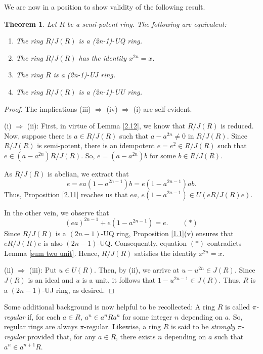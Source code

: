 \documentclass[10pt,a4paper]{amsart}
\newtheorem{theorem}{Theorem}[section]
\begin{document}
\medskip

We are now in a position to show validity of the following result.

\begin{theorem}\label{semipotent}
Let $R$ be a semi-potent ring. The following are equivalent:
\begin{enumerate}
\item	
The ring $R/J(R)$ is a (2n-1)-UQ ring.
\item	
The ring $R/J(R)$ has the identity $x^{2n} = x$.
\item	
The ring $R$ is a (2n-1)-UJ ring.
\item	
The ring $R/J(R)$ is a (2n-1)-UU ring.
\end{enumerate}
\end{theorem}

\begin{proof}
The implications (iii) $\Rightarrow$ (iv) $\Rightarrow$ (i) are self-evident.

(i) $\Rightarrow$ (ii): First, in virtue of Lemma \ref{2.12}, we know that \( R/J(R) \) is reduced. Now, suppose there is \( a \in R/J(R) \) such that \( a - a^{2n} \neq 0 \) in \( R/J(R) \). Since \( R/J(R) \) is semi-potent, there is an idempotent \( e = e^2 \in R/J(R) \) such that \( e \in (a - a^{2n})R/J(R) \). So, \( e = (a - a^{2n})b \) for some \( b \in R/J(R) \).

As \( R/J(R) \) is abelian, we extract that
\[
e = ea(1 - a^{2n-1})b = e(1 - a^{2n-1})ab.
\]
Thus, Proposition \ref{2.11} reaches us that \( ea,\, e(1 - a^{2n-1}) \in U(eR/J(R)e) \).

In the other vein, we observe that
\[
(ea)^{2n-1} + e(1 - a^{2n-1}) = e. \qquad (*)
\]
Since \( R/J(R) \) is a \( (2n - 1) \)-UQ ring, Proposition \ref{1.1}(v) ensures that \( eR/J(R)e \) is also \( (2n - 1) \)-UQ. Consequently, equation \( (*) \) contradicts Lemma \ref{sum two unit}. Hence, \( R/J(R) \) satisfies the identity \( x^{2n} = x \).

(ii) $\Rightarrow$ (iii): Put \( u \in U(R) \). Then, by (ii), we arrive at \( u - u^{2n} \in J(R) \). Since \( J(R) \) is an ideal and \( u \) is a unit, it follows that \( 1 - u^{2n-1} \in J(R) \). Thus, \( R \) is a \( (2n - 1) \)-UJ ring, as desired.
\end{proof}

Some additional background is now helpful to be recollected: A ring $R$ is called {\it $\pi$-regular} if, for each $a\in R$, $a^n\in a^nRa^n$ for some integer $n$ depending on $a$. So, regular rings are always $\pi$-regular. Likewise, a ring $R$ is said to be {\it strongly $\pi$-regular} provided that, for any $a\in R$, there exists $n$ depending on $a$ such that $a^n\in a^{n+1}R$.
\end{document}

